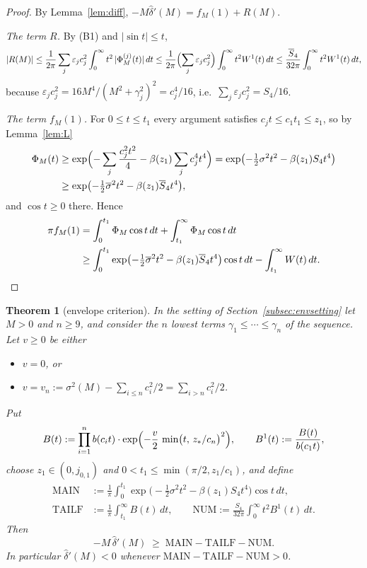 \documentclass[11pt]{amsart}
\newtheorem{theorem}{Theorem}[section]
\theoremstyle{definition}
\numberwithin{equation}{section}
\newcommand{\eps}{\varepsilon}
\newcommand{\hd}{\widehat\delta}
\begin{document}
\begin{proof}
By Lemma~\ref{lem:diff}, $-M\hd'(M)=f_M(1)+R(M)$.

\emph{The term $R$.} By (B1) and $|\sin t|\le t$,
\[
|R(M)|\le\frac1{2\pi}\sum_j\eps_jc_j^2\int_0^\infty t^2\,|\Phi_M^{(j)}(t)|\,dt
\le\frac1{2\pi}\Bigl(\sum_j\eps_jc_j^2\Bigr)\int_0^\infty t^2W^1(t)\,dt
\le\frac{\overline S_4}{32\pi}\int_0^\infty t^2W^1(t)\,dt,
\]
because $\eps_jc_j^2=16M^4/(M^2+\gamma_j^2)^2=c_j^4/16$, i.e.\
$\sum_j\eps_jc_j^2=S_4/16$.

\emph{The term $f_M(1)$.} For $0\le t\le t_1$ every argument
satisfies $c_jt\le c_1t_1\le z_1$, so by Lemma~\ref{lem:L}
\begin{align*}
\Phi_M(t)&\ge\exp\Bigl(-\sum_j\frac{c_j^2t^2}{4}-\beta(z_1)\sum_jc_j^4t^4\Bigr)
=\exp\bigl(-\tfrac12\sigma^2t^2-\beta(z_1)S_4t^4\bigr)\\
&\ge\exp\bigl(-\tfrac12\overline{\sigma}^2t^2-\beta(z_1)\overline S_4t^4\bigr),
\end{align*}
and $\cos t\ge0$ there. Hence
\begin{align*}
\pi f_M(1)&=\int_0^{t_1}\Phi_M\cos t\,dt+\int_{t_1}^\infty\Phi_M\cos t\,dt\\
&\ge\int_0^{t_1}\exp\bigl(-\tfrac12\overline{\sigma}^2t^2-\beta(z_1)\overline S_4t^4\bigr)\cos t\,dt
-\int_{t_1}^\infty W(t)\,dt .\qedhere
\end{align*}
\end{proof}

\begin{theorem}[envelope criterion]\label{thm:envelope}
In the setting of Section~\ref{subsec:envsetting} let $M>0$ and
$n\ge9$, and consider the $n$ lowest terms
$\gamma_1\le\cdots\le\gamma_n$ of the sequence. Let $v\ge0$ be either
\begin{itemize}
\item[(a)] $v=0$, or
\item[(b)] $v=v_n:=\sigma^2(M)-\sum_{i\le n}c_i^2/2
=\sum_{i>n}c_i^2/2$.
\end{itemize}
Put
\[
B(t):=\prod_{i=1}^nb(c_it)\cdot
\exp\Bigl(-\frac v2\,\min\bigl(t,\,z_*/c_n\bigr)^2\Bigr),
\qquad B^1(t):=\frac{B(t)}{b(c_1t)},
\]
choose $z_1\in(0,j_{0,1})$ and $0<t_1\le\min(\pi/2,z_1/c_1)$, and
define
\begin{align*}
\mathrm{MAIN}&:=\frac1\pi\int_0^{t_1}
\exp\bigl(-\tfrac12\sigma^2t^2-\beta(z_1)S_4t^4\bigr)\cos t\,dt,\\
\mathrm{TAILF}&:=\frac1\pi\int_{t_1}^\infty B(t)\,dt,\qquad
\mathrm{NUM}:=\frac{S_4}{32\pi}\int_0^\infty t^2B^1(t)\,dt .
\end{align*}
Then
\[
-M\,\hd'(M)\;\ge\;\mathrm{MAIN}-\mathrm{TAILF}-\mathrm{NUM}.
\]
In particular $\hd'(M)<0$ whenever
$\mathrm{MAIN}-\mathrm{TAILF}-\mathrm{NUM}>0$.
\end{theorem}
\end{document}
